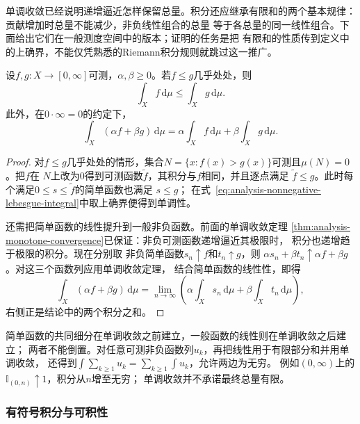 单调收敛已经说明递增逼近怎样保留总量。积分还应继承有限和的两个基本规律：贡献增加时总量不能减少，非负线性组合的总量
等于各总量的同一线性组合。下面给出它们在一般测度空间中的版本；证明的任务是把
有限和的性质传到定义中的上确界，不能仅凭熟悉的Riemann积分规则就跳过这一推广。
\begin{lemma}[非负积分的线性与单调性]
\label{lem:analysis-nonnegative-integral-properties}
设$f,g:X\to[0,\infty]$可测，$\alpha,\beta\geq0$。若$f\leq g$几乎处处，则
\[
  \int_X f\,\mathrm{d}\mu\leq\int_X g\,\mathrm{d}\mu.
\]
此外，在$0\cdot\infty=0$的约定下，
\[
  \int_X(\alpha f+\beta g)\,\mathrm{d}\mu
  =
  \alpha\int_X f\,\mathrm{d}\mu
  +
  \beta\int_X g\,\mathrm{d}\mu.
\]
\end{lemma}
\begin{proof}
对$f\leq g$几乎处处的情形，集合$N=\{x:f(x)>g(x)\}$可测且$\mu(N)=0$。把$f$在
$N$上改为$0$得到可测函数$\widetilde f$，其积分与$f$相同，并且逐点满足
$\widetilde f\leq g$。此时每个满足$0\leq s\leq\widetilde f$的简单函数也满足
$s\leq g$；
在式~\eqref{eq:analysis-nonnegative-lebesgue-integral}中取上确界便得到单调性。

还需把简单函数的线性提升到一般非负函数。前面的单调收敛定理
\ref{thm:analysis-monotone-convergence}已保证：非负可测函数递增逼近其极限时，
积分也递增趋于极限的积分。现在分别取
非负简单函数$s_n\uparrow f$和$t_n\uparrow g$，则
$\alpha s_n+\beta t_n\uparrow\alpha f+\beta g$。对这三个函数列应用单调收敛定理，
结合简单函数的线性性，即得
\[
  \int_X(\alpha f+\beta g)\,\mathrm{d}\mu
  =
  \lim_{n\to\infty}
  \left(
    \alpha\int_Xs_n\,\mathrm{d}\mu
    +
    \beta\int_Xt_n\,\mathrm{d}\mu
  \right),
\]
右侧正是结论中的两个积分之和。
\end{proof}

简单函数的共同细分在单调收敛之前建立，一般函数的线性则在单调收敛之后建立；
两者不能倒置。对任意可测非负函数列$u_k$，再把线性用于有限部分和并用单调收敛，
还得到$\int\sum_{k\geq1}u_k=\sum_{k\geq1}\int u_k$，允许两边为无穷。
例如$(0,\infty)$上的$\mathbb I_{(0,n)}\uparrow1$，积分从$n$增至无穷；
单调收敛并不承诺最终总量有限。

\subsubsection{有符号积分与可积性}

